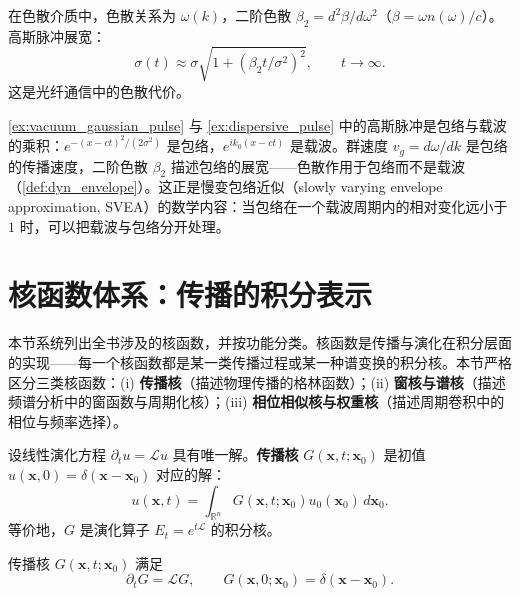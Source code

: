 \begin{example}[色散介质中的脉冲展宽]\label{ex:dispersive_pulse}
在色散介质中，色散关系为 $\omega(k)$，二阶色散 $\beta_2 = d^2\beta/d\omega^2$（$\beta = \omega n(\omega)/c$）。高斯脉冲展宽：
\[
\sigma(t) \approx \sigma\sqrt{1 + (\beta_2 t/\sigma^2)^2}, \qquad t\to\infty.
\]
这是光纤通信中的色散代价。
\end{example}

\begin{remark}[脉冲的包络与载波]\label{rem:pulse_envelope}
\cref{ex:vacuum_gaussian_pulse} 与 \cref{ex:dispersive_pulse} 中的高斯脉冲是包络与载波的乘积：$e^{-(x-ct)^2/(2\sigma^2)}$ 是包络，$e^{ik_0(x-ct)}$ 是载波。群速度 $v_g=d\omega/dk$ 是包络的传播速度，二阶色散 $\beta_2$ 描述包络的展宽——色散作用于包络而不是载波（\cref{def:dyn_envelope}）。这正是慢变包络近似（slowly varying envelope approximation, SVEA）的数学内容：当包络在一个载波周期内的相对变化远小于 $1$ 时，可以把载波与包络分开处理。
\end{remark}

\section{核函数体系：传播的积分表示}\label{sec:kernel_functions}

\begin{remark}[本节定位]\label{rem:kernel_section_positioning}
本节系统列出全书涉及的核函数，并按功能分类。核函数是传播与演化在积分层面的实现——每一个核函数都是某一类传播过程或某一种谱变换的积分核。本节严格区分三类核函数：(i) \textbf{传播核}（描述物理传播的格林函数）；(ii) \textbf{窗核与谱核}（描述频谱分析中的窗函数与周期化核）；(iii) \textbf{相位相似核与权重核}（描述周期卷积中的相位与频率选择）。
\end{remark}

\begin{definition}\label{def:propagation_kernel}
设线性演化方程 $\partial_t u = \mathcal{L}u$ 具有唯一解。\textbf{传播核} $G(\mathbf{x},t;\mathbf{x}_0)$ 是初值 $u(\mathbf{x},0) = \delta(\mathbf{x}-\mathbf{x}_0)$ 对应的解：
\[
u(\mathbf{x},t) = \int_{\mathbb{R}^n}G(\mathbf{x},t;\mathbf{x}_0)u_0(\mathbf{x}_0)\,d\mathbf{x}_0.
\]
等价地，$G$ 是演化算子 $E_t = e^{t\mathcal{L}}$ 的积分核。
\end{definition}

\begin{theorem}[传播核满足演化方程与初值条件]\label{thm:propagation_kernel_satisfies_pde}
传播核 $G(\mathbf{x},t;\mathbf{x}_0)$ 满足
\[
\partial_t G = \mathcal{L}G, \qquad G(\mathbf{x},0;\mathbf{x}_0) = \delta(\mathbf{x}-\mathbf{x}_0).
\]
\end{theorem}

